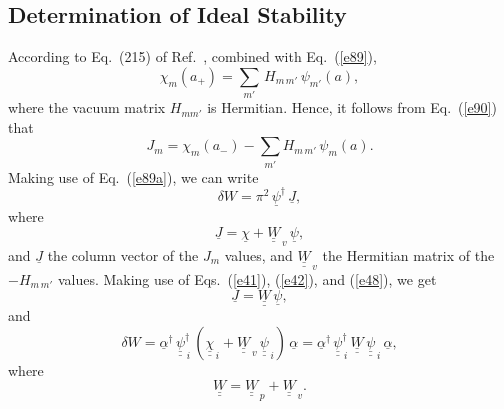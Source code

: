\documentclass[12pt,prb,aps]{revtex4-1}
\begin{document}
\subsection{Determination of Ideal Stability}
According to Eq.~(215) of Ref.~, combined with Eq.~(\ref{e89}), 
\begin{equation}
\chi_m(a_+)=\sum_{m'}\,H_{m\,m'}\,\psi_{m'}(a),
\end{equation}
where the vacuum matrix $H_{mm'}$ is Hermitian. 
Hence, it follows from Eq.~(\ref{e90}) that
\begin{equation}
J_m = \chi_m(a_-)-\sum_{m'} H_{m\,m'}\,\psi_m(a).
\end{equation}
Making use of Eq.~(\ref{e89a}), we can write
\begin{equation}
\delta W =\pi^2\, \underline{\psi}^\dag\,\underline{J},
\end{equation}
where 
\begin{equation}
\underline{J} = \underline{\chi}+ \underline{\underline{W}}_{\,v}\,\underline{\psi},
\end{equation}
and  $\underline{J}$ the column vector of the $J_m$ values, 
and $\underline{\underline{W}}_{\,v}$  the Hermitian matrix of the $-H_{m\,m'}$ values. 
Making use of Eqs.~(\ref{e41}), (\ref{e42}), and (\ref{e48}), we get 
\begin{equation}
\underline{J} = \underline{\underline{W}}\,\underline{\psi},
\end{equation}
and
\begin{equation}
\delta W = \underline{\alpha}^\dag\,\underline{\underline{\psi}}^{\dag}_{\,i}\,(\underline{\underline{\chi}}_{\,i} + \underline{\underline{W}}_{\,v}\,\underline{\underline{\psi}}_{\,i})\,\underline{\alpha}=  \underline{\alpha}^\dag\,\underline{\underline{\psi}}^{\dag}_{\,i}\,\underline{\underline{W}}\,\underline{\underline{\psi}}_{\,i}\,\underline{\alpha},
\end{equation}
where
\begin{equation}
\underline{\underline{W}}=\underline{\underline{W}}_{\,p}+\underline{\underline{W}}_{\,v}.
\end{equation}
\end{document}
